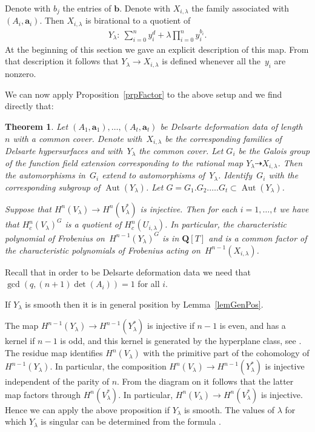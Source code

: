 \documentclass[pdftex]{sigma}
\numberwithin{equation}{section}
\newtheorem{Theorem}{Theorem}[section]
\DeclareMathOperator{\Aut}{Aut}
\begin{document}
Denote with $b_j$ the entries of $\mathbf{b}$. Denote with $X_{i,\lambda}$ the family associated with $(A_i,\mathbf{a}_i)$. Then $X_{i,\lambda}$ is birational to a quotient of
\begin{gather*}Y_\lambda\colon \ \sum_{i=0}^n y_i^{d} +\lambda \prod_{i=0}^n y_i^{b_i}.\end{gather*}
At the beginning of this section we gave an explicit description of this map. From that description it follows that $Y_\lambda \to X_{i,\lambda}$ is def\/ined whenever all the~$y_i$ are nonzero.

We can now apply Proposition~\ref{prpFactor} to the above setup and we f\/ind directly that:

\begin{Theorem} \label{thmMainO} Let $(A_1,\mathbf{a}_1), \dots, (A_t,\mathbf{a}_t)$ be Delsarte deformation data of length $n$ with a common cover. Denote with~$X_{i,\lambda}$ be the corresponding families of Delsarte hypersurfaces and with~$Y_\lambda$ the common cover. Let $G_i$ be the Galois group of the function field extension corresponding to the rational map $Y_\lambda\dashrightarrow X_{i,\lambda}$. Then the automorphisms in~$G_i$ extend to automorphisms of~$Y_{\lambda}$. Identify~$G_i$ with the corresponding subgroup of $\Aut(Y_{\lambda})$. Let $G=G_1.G_2.\dots.G_t\subset \Aut(Y_\lambda)$.

Suppose that $H^n(V_\lambda)\to H^n(V_\lambda^*)$ is injective. Then for each $i=1,\dots,t$ we have that $H^n_c(V_{\lambda})^G$ is a quotient of $H^n_c(U_{i,\lambda})$. In particular, the characteristic polynomial of Frobenius on~$H^{n-1}(Y_\lambda)^G$ is in $\mathbf{Q}[T]$ and is a common factor of the characteristic polynomials of Frobenius acting on~$H^{n-1}(X_{i,\lambda})$.
\end{Theorem}

\begin{Remark} Recall that in order to be Delsarte deformation data we need that $\gcd(q,(n+1)\det(A_i))=1$ for all $i$.
\end{Remark}

\begin{Remark} If $Y_\lambda$ is smooth then it is in general position by Lemma~\ref{lemGenPos}.

The map $H^ {n-1}(Y_{\lambda})\to H^{n-1}(Y_{\lambda}^*)$ is injective if $n-1$ is even, and has a kernel if $n-1$ is odd, and this kernel is generated by the hyperplane class, see \cite[Theorem~1.19]{Katz}. The residue map identif\/ies $H^{n}(V_{\lambda})$ with the primitive part of the cohomology of $H^{n-1}(Y_{\lambda})$. In particular, the composition $H^n(V_{\lambda})\to H^{n-1}(Y_{\lambda}^*)$ is injective independent of the parity of $n$. From the diagram on \cite[p.~79]{Katz} it follows that the latter map factors through $H^n(V_\lambda^*)$. In particular, $H^n(V_\lambda)\to H^n(V_\lambda^*)$ is injective. Hence we can apply the above proposition if $Y_\lambda$ is smooth. The values of $\lambda$ for which $Y_\lambda$ is singular can be determined from the formula \cite[Lemma~3.7]{zetafam}.
\end{Remark}
\end{document}
